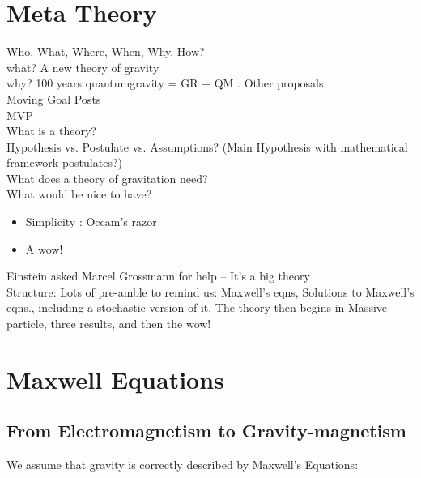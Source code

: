 \documentclass {article}
\begin{document}
\section{Meta Theory}

Who, What, Where, When, Why, How?
\\[0.15in]
what?    A new theory of  gravity
\\
why?   100 years quantumgravity = GR + QM . Other proposals
\\[1in]

Moving Goal Posts
\\

MVP
\\

What is a theory?
\\[1in]

Hypothesis vs. Postulate vs. Assumptions? (Main Hypothesis with mathematical framework postulates?)
\\[1in]



What does a theory of gravitation need?
\\[2in]

What would be nice to have? 
\begin{itemize}
	\item Simplicity : Occam's razor
	\item A wow!
\end{itemize}

\vspace{10pt}

Einstein asked Marcel Grossmann for help -- It's a big theory
\\[2in]

Structure: Lots of pre-amble to remind us: Maxwell's eqns, Solutions to Maxwell's eqns., including a stochastic version of it. The theory then begins in Massive particle, three results, and then the wow!


\newpage


\section{Maxwell Equations}
\subsection{From Electromagnetism to Gravity-magnetism}



We assume that gravity is correctly described by Maxwell's Equations:
\end{document}
